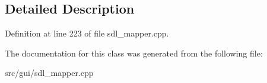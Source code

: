 \subsection{Detailed Description}


Definition at line 223 of file sdl\-\_\-mapper.\-cpp.



The documentation for this class was generated from the following file\-:\begin{DoxyCompactItemize}
\item 
src/gui/sdl\-\_\-mapper.\-cpp\end{DoxyCompactItemize}
